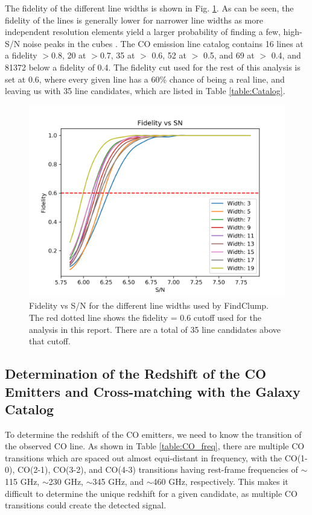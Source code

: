 The fidelity of the different line widths is shown in Fig. \ref{fig:Fid_map}. As can be seen, the fidelity of the lines is generally lower for narrower line widths as more independent resolution elements yield a larger probability of finding a few, high-S/N noise peaks in the cubes \cite{decarli2019alma}. The CO emission line catalog contains 16 lines at a fidelity $>$0.8, 20 at $>$0.7, 35 at $>$ 0.6, 52 at $>$ 0.5, and 69 at $>$ 0.4, and 81372 below a fidelity of 0.4. The fidelity cut used for the rest of this analysis is set at 0.6, where every given line has a 60\% chance of being a real line, and leaving us with 35 line candidates, which are listed in Table \ref{table:Catalog}.

\begin{figure}[!htbp]
\centering \includegraphics[width=120mm]{Fidelity_map.png}
\caption{Fidelity vs S/N for the different line widths used by FindClump. The red dotted line shows the fidelity = 0.6 cutoff used for the analysis in this report. There are a total of 35 line candidates above that cutoff.}
\label{fig:Fid_map}
\end{figure}

\subsection{Determination of the Redshift of the CO Emitters and Cross-matching with the Galaxy Catalog}

To determine the redshift of the CO emitters, we need to know the transition of the observed CO line. As shown in Table \ref{table:CO_freq}, there are multiple CO transitions which are spaced out almost equi-distant in frequency, with the CO(1-0), CO(2-1), CO(3-2), and CO(4-3) transitions having rest-frame frequencies of $\sim$115 GHz, $\sim$230 GHz, $\sim$345 GHz, and $\sim$460 GHz, respectively. This makes it difficult to determine the unique redshift for a given candidate, as multiple CO transitions could create the detected signal.

